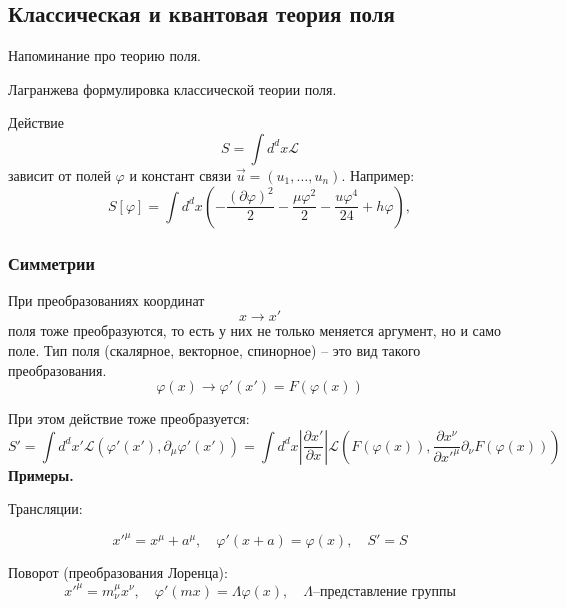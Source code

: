 \documentclass[a4paper,12pt]{article}
\theoremstyle{definition}
\theoremstyle{definition}
\theoremstyle{definition}
\begin{document}
\subsection*{Классическая и квантовая теория поля}
\label{sec:qft}
Напоминание про теорию поля.

Лагранжева формулировка классической теории поля.

 Действие
\begin{equation}
  S=\int d^dx \mathcal{L}
\end{equation}
зависит от полей $\varphi$ и констант связи $\vec u=(u_1,\dots,u_n)$.
Например:
\begin{equation}
  S[\varphi]=\int d^d x\left( -\frac{(\partial \varphi)^2}{2}-\frac{\mu \varphi^2}{2}-\frac{u\varphi^4}{24}+h\varphi\right),
\end{equation}


\subsubsection*{Симметрии}
\label{sec:symmetry}

При преобразованиях координат
\begin{equation}
  \label{eq:303}
  x\to x'
\end{equation}
поля тоже преобразуются, то есть у них не только меняется аргумент, но и само поле. Тип поля (скалярное, векторное, спинорное) -- это вид такого преобразования.
\begin{equation}
  \label{eq:304}
  \varphi(x)\to \varphi'(x')=F(\varphi(x))
\end{equation}

При этом действие тоже преобразуется:
\begin{equation}
  \label{eq:305}
  S'=\int d^{d}x' \mathcal{L}(\varphi'(x'),\partial_{\mu} \varphi'(x'))=\int d^{d}x \left|\frac{\partial x'}{\partial x}\right| \mathcal{L}(F(\varphi(x)),\frac{\partial x^{\nu}}{\partial x'^{\mu}} \partial_{\nu}F(\varphi(x)))
\end{equation}
{\bf Примеры.}

Трансляции:

\begin{equation*}
  \label{eq:306}
  x'^{\mu}=x^{\mu}+a^{\mu},\quad \varphi'(x+a)=\varphi(x),\quad S'=S
\end{equation*}

Поворот (преобразования Лоренца):
\begin{equation*}
  x'^{\mu}=m^{\mu}_{\nu} x^{\nu}, \quad \varphi'(m x)=\Lambda \varphi(x),\quad \Lambda \mbox{--представление группы} 
\end{equation*}
\end{document}
